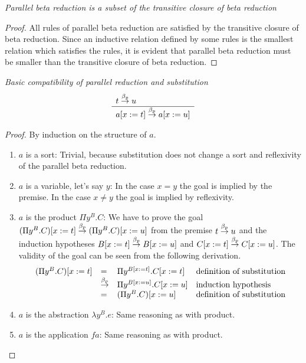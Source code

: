 \begin{lemma}
    \emph{Parallel beta reduction is a subset of the transitive closure of beta
    reduction}

    \begin{proof}
        All rules of parallel beta reduction are satisfied by the transitive
        closure of beta reduction. Since an inductive relation defined by some
        rules is the smallest relation which satisfies the rules, it is evident
        that parallel beta reduction must be smaller than the transitive closure
        of beta reduction.
    \end{proof}
\end{lemma}







\begin{lemma}
    \label{ParallelReductionSubstitution1}
    \emph{Basic compatibility of parallel reduction and substitution}
    $$
    \begin{array}{l} 
        t \stackrel{\beta_p}{\to} u
     \\ \hline 
        a[x:=t] \stackrel{\beta_p}{\to} a[x:=u]
    \end{array}
    $$

    \begin{proof}
    By induction on the structure of $a$.
    \begin{enumerate}
    \item $a$ is a sort: Trivial, because substitution does not change a sort
    and reflexivity of the parallel beta reduction.

    \item $a$ is a variable, let's say $y$: In the case $x=y$ the goal is
    implied by the premise. In the case $x \ne y$ the goal is implied by
    reflexivity.

    \item $a$ is the product $\Pi y^B. C$: We have to prove the goal
    $(\Pi y^B. C)[x:=t] \stackrel{\beta_p}{\to} (\Pi y^B.C)[x:=u]$ from the premise $t \stackrel{\beta_p}{\to}
    u$ and the induction hypotheses  $B[x:=t] \stackrel{\beta_p}{\to} B[x:=u]$ and
    $C[x:=t] \stackrel{\beta_p}{\to} C[x:=u]$. The validity of the goal can be seen from the
    following derivation.
    $$
    \begin{array}{lllll}
        (\Pi y^B. C)[x:=t]
        &=& \Pi y^{B[x:=t]}. C[x:=t]
        &\text{definition of substitution}
        \\
        &\stackrel{\beta_p}{\to}& \Pi y^{B[x:=u]}. C[x:=u]
        &\text {induction hypothesis}
        \\
        &=& (\Pi y^B. C)[x:=u]
        &\text{definition of substitution}
    \end{array}
    $$

    \item $a$ is the abstraction $\lambda y^B. e$: Same reasoning as with
    product.

    \item $a$ is the application $f a$: Same reasoning as with
    product.
    \end{enumerate}
    \end{proof}
\end{lemma}


